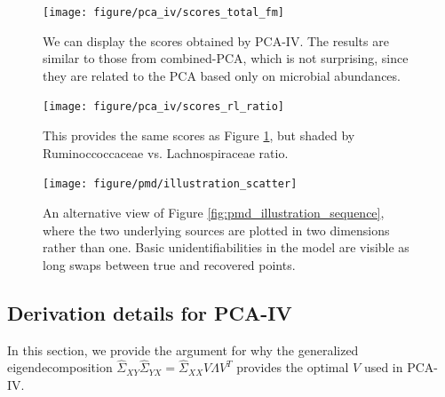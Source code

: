 \documentclass{article}
\begin{document}
\begin{figure}[ht]
  \centering
  \texttt{[image: figure/pca\_iv/scores\_total\_fm]}
  \caption{We can display the scores obtained by PCA-IV. The results are similar
    to those from combined-PCA, which is not surprising, since they are related
    to the PCA based only on microbial
    abundances. \label{fig:pca_iv_scores_total_fm} }
\end{figure}

\begin{figure}[ht]
  \centering
  \texttt{[image: figure/pca\_iv/scores\_rl\_ratio]}
  \caption{This provides the same scores as Figure
    \ref{fig:pca_iv_scores_total_fm}, but shaded by Ruminoccoccaceae vs.
    Lachnospiraceae ratio. \label{fig:pca_iv_scores_rl_ratio} }
\end{figure}

\begin{figure}[ht]
  \centering
  \texttt{[image: figure/pmd/illustration\_scatter]}
  \caption{An alternative view of Figure \ref{fig:pmd_illustration_sequence},
    where the two underlying sources are plotted in two dimensions rather than
    one. Basic unidentifiabilities in the model are visible as long swaps
    between true and recovered points. \label{fig:pmd_illustration_scatter} }
\end{figure}

\subsection{Derivation details for PCA-IV}
\label{subsec:pca_iv_derivation}

In this section, we provide the argument for why the generalized
eigendecomposition $\hat{\Sigma}_{XY}\hat{\Sigma}_{YX} =
\hat{\Sigma}_{XX}V\Lambda V^{T}$ provides the optimal $V$ used in PCA-IV.
\end{document}
